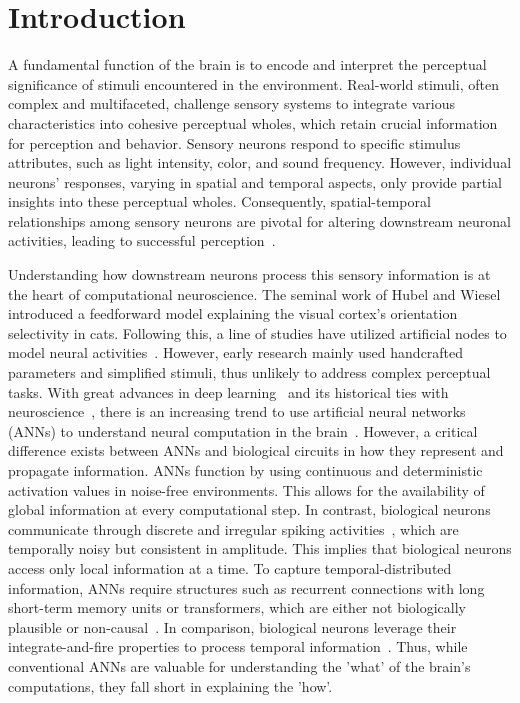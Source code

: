 \section{Introduction}
A fundamental function of the brain is to encode and interpret the perceptual significance of stimuli encountered in the environment. 
Real-world stimuli, often complex and multifaceted, challenge sensory systems to integrate various characteristics into cohesive perceptual wholes, which retain crucial information for perception and behavior. 
Sensory neurons respond to specific stimulus attributes, such as light intensity, color, and sound frequency. However, individual neurons' responses, varying in spatial and temporal aspects, only provide partial insights into these perceptual wholes.
Consequently, spatial-temporal relationships among sensory neurons are pivotal for altering downstream neuronal activities, leading to successful perception~\cite{Ackels2021, Caruso2018, Borghuis2019, Panzeri2010}.
 
Understanding how downstream neurons process this sensory information is at the heart of computational neuroscience. 
The seminal work of Hubel and Wiesel~\cite{Hubel1962} introduced a feedforward model explaining the visual cortex's orientation selectivity in cats. 
Following this, a line of studies have utilized artificial nodes to model neural activities~\cite{Jones1987, Olshausen1996}. 
However, early research mainly used handcrafted parameters and simplified stimuli, thus unlikely to address complex perceptual tasks.
With great advances in deep learning~\cite{LeCun2015} and its historical ties with neuroscience~\cite{Hassabis2017}, there is an increasing trend to use artificial neural networks (ANNs) to understand neural computation in the brain~\cite{KhalighRazavi2014, Cichy2016, Li2023}.
However, a critical difference exists between ANNs and biological circuits in how they represent and propagate information. 
ANNs function by using continuous and deterministic activation values in noise-free environments. 
This allows for the availability of global information at every computational step.
In contrast, biological neurons communicate through discrete and irregular spiking activities~\cite{Tomko1974, Tolhurst1983, Softky1993}, which are temporally noisy but consistent in amplitude. 
This implies that biological neurons access only local information at a time. 
To capture temporal-distributed information, ANNs require structures such as recurrent connections with long short-term memory units or transformers, which are either not biologically plausible or non-causal~\cite{Li2023}. 
In comparison, biological neurons leverage their integrate-and-fire properties to process temporal information~\cite{Koenig1996}.
Thus, while conventional ANNs are valuable for understanding the 'what' of the brain's computations, they fall short in explaining the 'how'.

